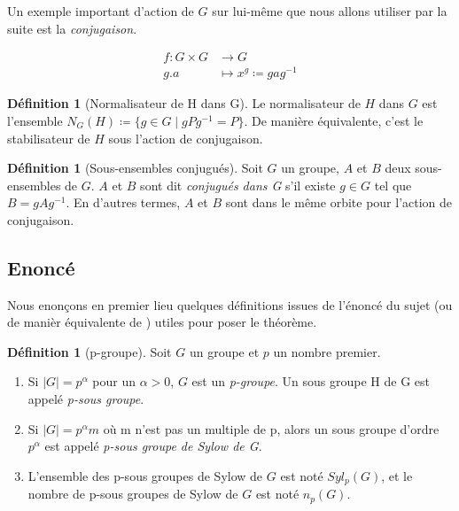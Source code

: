 \documentclass[french]{article}
\theoremstyle{definition}
\newtheorem{definition}[subsubsection]{Définition}
\theoremstyle{plain}
\theoremstyle{plain}
\theoremstyle{plain}
\theoremstyle{plain}
\theoremstyle{plain}
\begin{document}
Un exemple important d'action de \( G \) sur lui-même que nous allons utiliser par la suite est la \textit{conjugaison}.


\begin{align*}
	f : G \times G &\to G \\
	g . a &\mapsto x^{g} \coloneq gag^{-1}
\end{align*}

\begin{definition}[Normalisateur de H dans G]
	Le normalisateur de \( H \) dans \( G \) est l'ensemble 
	\( N_{G}({H}) \coloneq \{ g \in G \mid gPg^{-1} = P \} \).
	De manière équivalente, c'est le stabilisateur de \( H \) sous l'action de conjugaison.
\end{definition}

\begin{definition}[Sous-ensembles conjugués]
	Soit \( G \) un groupe, \( A \) et \( B \) deux sous-ensembles de \( G \). 
	\( A \) et \( B \) sont dit 
	\textit{conjugués dans G} s'il existe \( g \in G \) tel que \( B = gAg^{-1} \).
	En d'autres termes, \( A \) et \( B \) sont dans le même orbite pour l'action de conjugaison.
\end{definition}


\subsection{Enoncé}

Nous enonçons en premier lieu quelques définitions issues de l'énoncé du sujet (ou de manièr équivalente de \cite[p. ~123 et 139]{dummit2003abstract}) utiles pour poser le théorème.

\begin{definition}[p-groupe]
	Soit \( G \) un groupe et \( p \) un nombre premier.
	\begin{enumerate}[label = (\roman*)]
	\item Si \( |G| = p^{\alpha} \) pour un \( \alpha > 0 \), \( G \) est un \textit{p-groupe}. Un sous groupe H de G est appelé \textit{p-sous groupe}.
	\item Si \( |G| = p^{\alpha}m \) où m n'est pas un multiple de p, alors un sous groupe d'ordre \( p^{\alpha} \) est appelé \textit{p-sous groupe de Sylow de G}.
	\item L'ensemble des p-sous groupes de Sylow de \( G \) est noté \( Syl_{p}(G) \), et le nombre de p-sous groupes de Sylow de \( G \) est noté \( n_{p}(G) \).
	\end{enumerate}
\end{definition}
\end{document}
